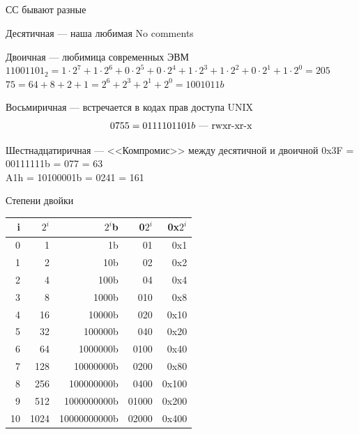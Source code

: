 \documentclass{beamer}
\begin{document}
    \subsection{}
    \begin{frame}{СС бывают разные}
        \begin{block}{Десятичная --- наша любимая}
            No comments
        \end{block}
        \begin{block}{Двоичная --- любимица современных ЭВМ}
        $11001101_2 = 1 \cdot 2^7 + 1 \cdot 2^6 + 0 \cdot 2^5 + 0 \cdot 2^4
            + 1 \cdot 2^3 + 1 \cdot 2^2 + 0 \cdot 2^1 + 1 \cdot 2^0 = 205$ \\
        $75 = 64 + 8 + 2 + 1 = 2^6 + 2^3 + 2^1 + 2^0 = 1001011b$
        \end{block}
        \begin{block}{Восьмиричная --- встречается в кодах прав доступа UNIX}
            $$
                0755 = 0111101101b \hbox{ --- rwxr-xr-x}
            $$
        \end{block}
        \begin{block}{Шестнадцатиричная --- <<Компромис>> между десятичной и двоичной}
            0x3F = 00111111b = 077 = 63 \\
            A1h = 10100001b = 0241 = 161
        \end{block}
    \end{frame}
    \begin{frame}{Степени двойки}
        \begin{table}
            \begin{tabular}{|r|r|r|r|r|}
            \hline i  & $2^i$ & $2^i$b       & 0$2^i$ & 0x$2^i$ \\
            \hline 0  &  1    & 1b           & 01    & 0x1      \\
            \hline 1  &  2    & 10b          & 02    & 0x2      \\
            \hline 2  &  4    & 100b         & 04    & 0x4      \\
            \hline 3  &  8    & 1000b        & 010   & 0x8      \\
            \hline 4  &  16   & 10000b       & 020   & 0x10     \\
            \hline 5  &  32   & 100000b      & 040   & 0x20     \\
            \hline 6  &  64   & 1000000b     & 0100  & 0x40     \\
            \hline 7  &  128  & 10000000b    & 0200  & 0x80     \\
            \hline 8  &  256  & 100000000b   & 0400  & 0x100    \\
            \hline 9  &  512  & 1000000000b  & 01000 & 0x200    \\
            \hline 10 &  1024 & 10000000000b & 02000 & 0x400    \\
            \hline    
            \end{tabular}
        \end{table}
    \end{frame}
\end{document}
